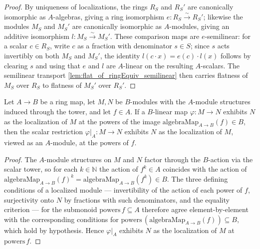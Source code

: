 \begin{proof}
  \leanok
  By uniqueness of localizations, the rings \(R_S\) and \(R_S'\) are canonically isomorphic as
  \(A\)-algebras, giving a ring isomorphism \(e : R_S \xrightarrow{\sim} R_S'\); likewise the
  modules \(M_S\) and \(M_S'\) are canonically isomorphic as \(A\)-modules, giving an additive
  isomorphism \(l : M_S \xrightarrow{\sim} M_S'\). These comparison maps are \(e\)-semilinear: for a
  scalar \(c \in R_S\), write \(c\) as a fraction with denominator \(s \in S\); since \(s\) acts
  invertibly on both \(M_S\) and \(M_S'\), the identity \(l(c \cdot x) = e(c) \cdot l(x)\) follows
  by clearing \(s\) and using that \(e\) and \(l\) are \(A\)-linear on the resulting \(A\)-scalars.
  The semilinear transport \cref{lem:flat_of_ringEquiv_semilinear} then carries flatness of \(M_S\)
  over \(R_S\) to flatness of \(M_S'\) over \(R_S'\).
\end{proof}

\begin{lemma}

  \label{lem:isLocalizedModule_powers_restrictScalars}
  Let \(A \to B\) be a ring map, let \(M, N\) be \(B\)-modules with the \(A\)-module structures
  induced through the tower, and let \(f \in A\). If a \(B\)-linear map \(\varphi : M \to N\)
  exhibits \(N\) as the localization of \(M\) at the powers of the image
  \(\mathrm{algebraMap}_{A \to B}(f) \in B\), then the scalar restriction
  \(\varphi|_A : M \to N\) exhibits \(N\) as the localization of \(M\), viewed as an \(A\)-module,
  at the powers of \(f\).
\end{lemma}

\begin{proof}

\leanok
  The \(A\)-module structures on \(M\) and \(N\) factor through the \(B\)-action via the scalar
  tower, so for each \(k \in \mathbb{N}\) the action of \(f^k \in A\) coincides with the action of
  \(\mathrm{algebraMap}_{A \to B}(f)^k = \mathrm{algebraMap}_{A \to B}(f^k) \in B\). The three
  defining conditions of a localized module — invertibility of the action of each power of \(f\),
  surjectivity onto \(N\) by fractions with such denominators, and the equality criterion — for the
  submonoid \(\mathrm{powers}\,f \subseteq A\) therefore agree element-by-element with the
  corresponding conditions for \(\mathrm{powers}\,(\mathrm{algebraMap}_{A \to B}(f)) \subseteq B\),
  which hold by hypothesis. Hence \(\varphi|_A\) exhibits \(N\) as the localization of \(M\) at
  \(\mathrm{powers}\,f\).
\end{proof}

